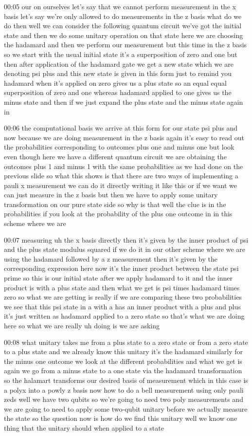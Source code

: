 00:05
our on ourselves let's say that we cannot perform
measurement in the x basis let's say we're only allowed to do measurements in
the z basis what do we do then well we can consider the following quantum
circuit we've got the initial state and then we do some unitary operation on
that state here we are choosing the hadamard
and then we perform our measurement but this time in the z basis
so we start with the usual initial state it's a superposition of zero and one
but then after application of the hadamard gate
we get a new state which we are denoting psi plus
and this new state is given in this form just to remind you hadamard when it's
applied on zero gives us a plus state so an equal equal
superposition of zero and one whereas hadamard applied to one gives us the minus
state and then if we just expand the plus state and the minus state again in

00:06
the computational basis we arrive at this form for our state psi plus
and now because we are doing measurement in the z basis again it's easy to read
out the probabilities corresponding to outcomes plus one and minus one but look
even though here we have a different quantum circuit
we are obtaining the outcomes plus 1 and minus 1
with the same probabilities as we had done on the previous slide
so what this shows is that there are two ways of implementing a pauli x
measurement we can do it directly writing it like this
or if we want we can just measure in the z basis
but then we have to apply some unitary transformation on our pure state side
so why is that well the clue is in the probabilities if you look at
the probability of the plus one outcome in in this scheme where we are

00:07
measuring uh the x basis directly then it's given by
the inner product of psi and the plus state modulus squared
if we do it in our other scheme where we are using the hadamard followed by a z
measurement then it's given by the corresponding expression here
now it's the inner product between the state psi prime
so this is our initial state after we apply hadamard to it
and the inner product is with a plus state and then what we get is
psi times hadamard times zero so what we are getting is really if we
are comparing these two probabilities we see that this psi state in a
with a has an inner product with a plus and plus it's just written as
hadamard applied to a zero state so that's what we are doing here
so what we are really uh doing is we are asking

00:08
what unitary takes me from a plus state to a zero state or from a zero state to
a plus state and we already know this unitary it's
the hadamard similarly for the minus one outcome
we look at the different probabilities and what we get is again
we go from a minus state to a one state via the hadamard transformation
so the halamart transforms our desired basis of measurement
which in this case is a polyx into a powly z basis
now how to do a bell measurement using only pauli zeds
well we have two qubits so we're going to need two poly measurements
and we are going to need to apply some two-qubit unitary before we
actually measure the state so the question now is how do we find this unitary
well we know one thing that the unitary should when applied to a state

